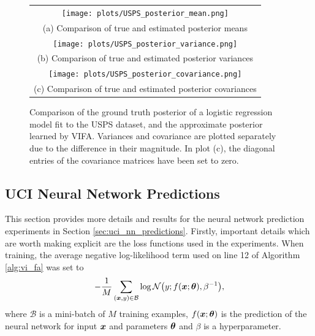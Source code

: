 \documentclass[10pt]{article} %
\begin{document}
\begin{figure}[!htbp] 
	\begin{tabular}{c}
		\texttt{[image: plots/USPS\_posterior\_mean.png]} \\
		(a) Comparison of true and estimated posterior means \\[6pt] 
		 \texttt{[image: plots/USPS\_posterior\_variance.png]} \\
		(b) Comparison of true and estimated posterior variances \\[6pt] 
		\texttt{[image: plots/USPS\_posterior\_covariance.png]} \\
		(c) Comparison of true and estimated posterior covariances \\[6pt] 
	\end{tabular}
	\caption{Comparison of the ground truth posterior of a logistic regression model fit to the USPS dataset, and the approximate posterior learned by VIFA. Variances and covariance are plotted separately due to the difference in their magnitude. In plot (c), the diagonal entries of the covariance matrices have been set to zero.}
	\label{fig:posterior_USPS}
\end{figure}


\subsection{UCI Neural Network Predictions}\label{app:uci_nn_predictions}

This section provides more details and results for the neural network prediction experiments in Section \ref{sec:uci_nn_predictions}. Firstly, important details which are worth making explicit are the loss functions used in the experiments. When training, the average negative log-likelihood term used on line 12 of Algorithm \ref{alg:vi_fa} was set to
\begin{equation}\label{eqn:train_nll}
	-\frac{1}{M} \sum_{({\bm{x}}, y) \in \mathcal{B}} \log \mathcal{N}\big(y; f({\bm{x}}; {\bm{\theta}}), \beta^{-1}\big),
\end{equation}
where $\mathcal{B}$ is a mini-batch of $M$ training examples, $f({\bm{x}}; {\bm{\theta}})$ is the prediction of the neural network for input ${\bm{x}}$ and parameters ${\bm{\theta}}$ and $\beta$ is a hyperparameter. 
\end{document}
